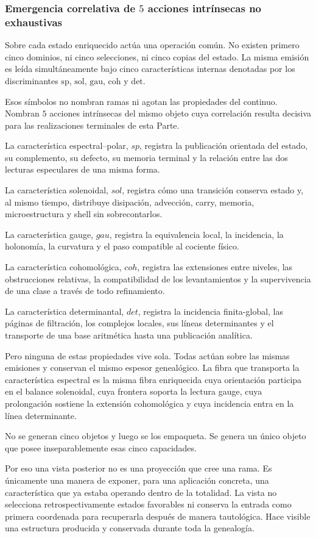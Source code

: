 \subsubsection{Emergencia correlativa de \texorpdfstring{\(5\)}{5} acciones intrínsecas no exhaustivas}
Sobre cada estado enriquecido actúa una operación común. No existen primero cinco dominios, ni cinco selecciones, ni cinco copias del estado. La misma emisión es leída simultáneamente bajo cinco características internas denotadas por los discriminantes \(\mathrm{sp}\), \(\mathrm{sol}\), \(\mathrm{gau}\), \(\mathrm{coh}\) y \(\mathrm{det}\).\par
Esos símbolos no nombran ramas ni agotan las propiedades del continuo. Nombran
\(5\) acciones intrínsecas del mismo objeto cuya correlación resulta decisiva
para las realizaciones terminales de esta Parte.\par
La característica espectral–polar, \(sp\), registra la publicación orientada del estado, su complemento, su defecto, su memoria terminal y la relación entre las dos lecturas especulares de una misma forma.\par
La característica solenoidal, \(sol\), registra cómo una transición conserva estado y, al mismo tiempo, distribuye disipación, advección, carry, memoria, microestructura y shell sin sobrecontarlos.\par
La característica gauge, \(gau\), registra la equivalencia local, la incidencia, la holonomía, la curvatura y el paso compatible al cociente físico.\par
La característica cohomológica, \(coh\), registra las extensiones entre niveles, las obstrucciones relativas, la compatibilidad de los levantamientos y la supervivencia de una clase a través de todo refinamiento.\par
La característica determinantal, \(det\), registra la incidencia finita-global, las páginas de filtración, los complejos locales, sus líneas determinantes y el transporte de una base aritmética hasta una publicación analítica.\par
Pero ninguna de estas propiedades vive sola. Todas actúan sobre las mismas emisiones y conservan el mismo espesor genealógico. La fibra que transporta la característica espectral es la misma fibra enriquecida cuya orientación participa en el balance solenoidal, cuya frontera soporta la lectura gauge, cuya prolongación sostiene la extensión cohomológica y cuya incidencia entra en la línea determinante.\par
No se generan cinco objetos y luego se los empaqueta. Se genera un único objeto que posee inseparablemente esas cinco capacidades.\par
Por eso una vista posterior no es una proyección que cree una rama. Es únicamente una manera de exponer, para una aplicación concreta, una característica que ya estaba operando dentro de la totalidad. La vista no selecciona retrospectivamente estados favorables ni conserva la entrada como primera coordenada para recuperarla después de manera tautológica. Hace visible una estructura producida y conservada durante toda la genealogía.\par
{}
